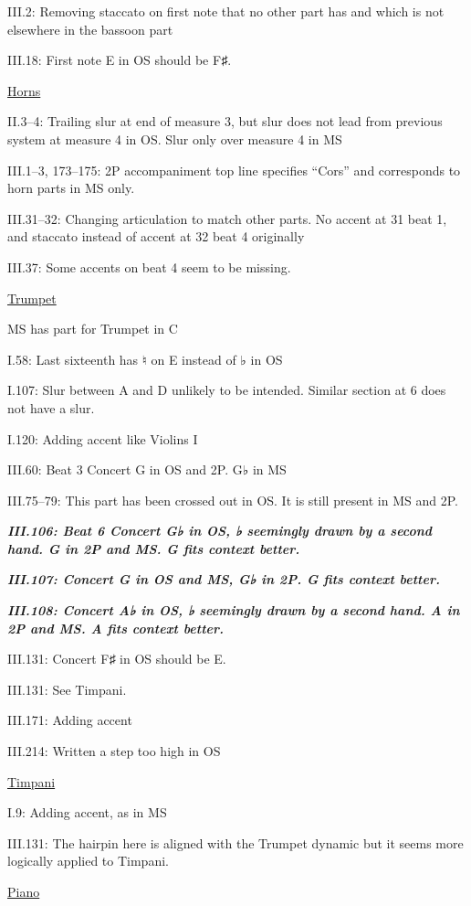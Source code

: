 \documentclass[twoside]{article}
\begin{document}
\begin{hangparas}{15pt}{1}
\begin{multicols}{2}
III.2: Removing staccato on first note that no other part has and which is not elsewhere in the bassoon part

III.18: First note E in OS should be F♯.

\underline{Horns}

II.3--4: Trailing slur at end of measure 3, but slur does not lead from previous system at measure 4 in OS. Slur only over measure 4 in MS

III.1--3, 173--175: 2P accompaniment top line specifies ``Cors'' and corresponds to horn parts in MS only.

III.31--32: Changing articulation to match other parts. No accent at 31 beat 1, and staccato instead of accent at 32 beat 4 originally

III.37: Some accents on beat 4 seem to be missing.

\underline{Trumpet}

MS has part for Trumpet in C

I.58: Last sixteenth has ♮ on E instead of ♭ in OS

I.107: Slur between A and D unlikely to be intended. Similar section at 6 does not have a slur.

I.120: Adding accent like Violins I

III.60: Beat 3 Concert G in OS and 2P. G♭ in MS

III.75--79: This part has been crossed out in OS. It is still present in MS and 2P.

\textbf{\textit{III.106: Beat 6 Concert G♭ in OS, ♭ seemingly drawn by a second hand. G in 2P and MS. G fits context better.}}

\textbf{\textit{III.107: Concert G in OS and MS, G♭ in 2P. G fits context better.}}

\textbf{\textit{III.108: Concert A♭ in OS, ♭ seemingly drawn by a second hand. A in 2P and MS. A fits context better.}}

III.131: Concert F♯ in OS should be E.

III.131: See Timpani.

III.171: Adding accent

III.214: Written a step too high in OS

\underline{Timpani}

I.9: Adding accent, as in MS

III.131: The hairpin here is aligned with the Trumpet dynamic but it seems more logically applied to Timpani.

\underline{Piano}


\end{multicols}
\end{hangparas}
\end{document}
